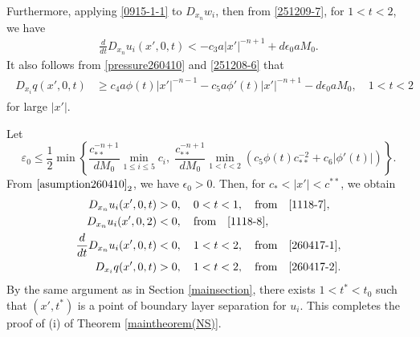 \documentclass{amsart}
\numberwithin{equation}{section}
\newcommand{\ep}{{ \epsilon  }}
\newcommand {\al}{\alpha}
\newenvironment{pfthm-NS}{{\par\noindent
            \textbf{Proof of Theorem \ref{maintheorem(NS)}}\quad}}{\hfill $\square$}
\begin{document}
\begin{pfthm-NS}
Furthermore, applying \eqref{0915-1-1}  to $ D_{x_n} w_i$, then   from \eqref{251209-7}, for $1 < t < 2$, we have
\begin{align}\label{260417-1}
\frac{d}{dt}  D_{x_n} u_i(x', 0,t) < - c_3   a  |x'|^{-n +1} +  d  \ep_0 a M_0.
\end{align}
It also follows from %
\eqref{pressure260410}  and \eqref{251208-6} that
\begin{align}\label{260417-2}
\begin{split}
D_{x_i} q (x', 0,t) & \geq  c_4  a\phi(t)|x'|^{-n -1}  -  c_5 a \phi' (t) |x'|^{-n +1}  -  d  \ep_0 a M_0, \quad 1 < t<2
\end{split}
\end{align}
for large $|x'|$.




Let 
\[
\varepsilon_0 \le \frac12 \min\left\{
\frac{c_{**}^{-n+1}}{dM_0}\min_{1\le i\le 5} c_i,\;
\frac{c_{**}^{-n+1}}{dM_0}\min_{1<t<2}\left(c_5 \phi(t)c_{**}^{-2}+c_6|\phi'(t)|\right)
\right\}.
\]
From  $\eqref{asumption260410}_2$, we have $\ep_0 > 0$.  Then, for $ c_* < |x'| < c^{**}$,  we obtain
\begin{align*}
D_{x_n} u_i (x', 0, t) &> 0, \quad 0 < t < 1, \quad \mbox{from} \quad \eqref{1118-7}, \\
D_{x_n} u_i (x', 0, 2) &< 0, \quad  \mbox{from} \quad \eqref{1118-8}, \\
\frac{d}{dt}  D_{x_n} u_i(x', 0,t) &< 0, \quad 1 < t < 2, \quad \mbox{from} \quad \eqref{260417-1},\\
D_{x_i} q (x', 0,t) &> 0, \quad 1 < t<2, \quad \mbox{from} \quad \eqref{260417-2}.
\end{align*}
By the same argument as in Section \ref{mainsection}, there exists $1 < t^* < t_0$ such that $(x', t^*)$ is a point of boundary layer separation for $u_i$.
This completes the proof of (i)  of Theorem \ref{maintheorem(NS)}.  


\end{pfthm-NS}
\end{document}

